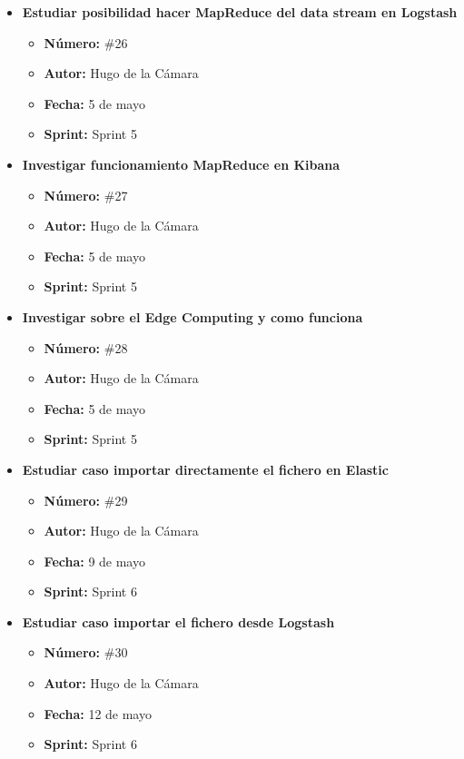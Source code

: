 \begin{itemize}
    \item \textbf{Estudiar posibilidad hacer MapReduce del data stream en Logstash}
    \begin{itemize}
        \item \textbf{Número:} \#26
        \item \textbf{Autor:} Hugo de la Cámara
        \item \textbf{Fecha:} 5 de mayo
        \item \textbf{Sprint:} Sprint 5
    \end{itemize}
    
    \item \textbf{Investigar funcionamiento MapReduce en Kibana}
    \begin{itemize}
        \item \textbf{Número:} \#27
        \item \textbf{Autor:} Hugo de la Cámara
        \item \textbf{Fecha:} 5 de mayo
        \item \textbf{Sprint:} Sprint 5
    \end{itemize}
    
    \item \textbf{Investigar sobre el Edge Computing y como funciona}
    \begin{itemize}
        \item \textbf{Número:} \#28
        \item \textbf{Autor:} Hugo de la Cámara
        \item \textbf{Fecha:} 5 de mayo
        \item \textbf{Sprint:} Sprint 5
    \end{itemize}
    
    \item \textbf{Estudiar caso importar directamente el fichero en Elastic}
    \begin{itemize}
        \item \textbf{Número:} \#29
        \item \textbf{Autor:} Hugo de la Cámara
        \item \textbf{Fecha:} 9 de mayo
        \item \textbf{Sprint:} Sprint 6
    \end{itemize}
    
    \item \textbf{Estudiar caso importar el fichero desde Logstash}
    \begin{itemize}
        \item \textbf{Número:} \#30
        \item \textbf{Autor:} Hugo de la Cámara
        \item \textbf{Fecha:} 12 de mayo
        \item \textbf{Sprint:} Sprint 6
    \end{itemize}
    

\end{itemize}
